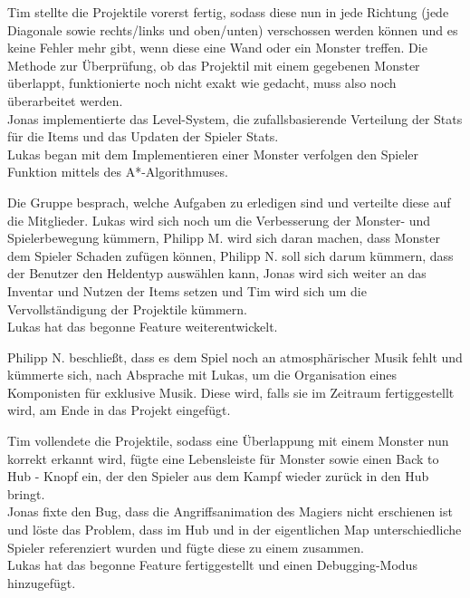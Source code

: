 Tim stellte die Projektile vorerst fertig, sodass diese nun in jede Richtung (jede Diagonale sowie rechts/links und oben/unten) verschossen werden können und es keine Fehler mehr gibt, wenn diese eine Wand oder ein Monster treffen. Die Methode zur Überprüfung, ob das Projektil mit einem gegebenen Monster überlappt, funktionierte noch nicht exakt wie gedacht, muss also noch überarbeitet werden. \\
Jonas implementierte das Level-System, die zufallsbasierende Verteilung der Stats für die Items und das Updaten der Spieler Stats. \\
Lukas began mit dem Implementieren einer \glqq{}Monster verfolgen den Spieler\grqq{} Funktion mittels des A*-Algorithmuses. \\


Die Gruppe besprach, welche Aufgaben zu erledigen sind und verteilte diese auf die Mitglieder. Lukas wird sich noch um die Verbesserung der Monster- und Spielerbewegung kümmern, Philipp M. wird sich daran machen, dass Monster dem Spieler Schaden zufügen können, Philipp N. soll sich darum kümmern, dass der Benutzer den Heldentyp auswählen kann, Jonas wird sich weiter an das Inventar und Nutzen der Items setzen und Tim wird sich um die Vervollständigung der Projektile kümmern. \\
Lukas hat das begonne Feature weiterentwickelt. \\


Philipp N. beschließt, dass es dem Spiel noch an atmosphärischer Musik fehlt und kümmerte sich, nach Absprache mit Lukas, um die Organisation eines Komponisten für exklusive Musik. Diese wird, falls sie im Zeitraum fertiggestellt wird, am Ende in das Projekt eingefügt. \\


Tim vollendete die Projektile, sodass eine Überlappung mit einem Monster nun korrekt erkannt wird, fügte eine Lebensleiste für Monster sowie einen \glqq{}Back to Hub\grqq{} - Knopf ein, der den Spieler aus dem Kampf wieder zurück in den Hub bringt. \\
Jonas fixte den Bug, dass die Angriffsanimation des Magiers nicht erschienen ist und löste das Problem, dass im Hub und in der eigentlichen Map unterschiedliche Spieler referenziert wurden und fügte diese zu einem zusammen. \\
Lukas hat das begonne Feature fertiggestellt und einen Debugging-Modus hinzugefügt. \\

